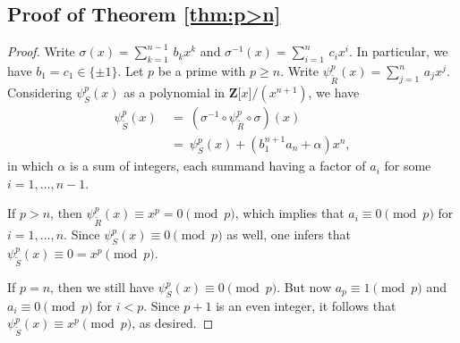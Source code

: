 \documentclass[reqno,11pt]{amsart}
\numberwithin{equation}{subsection}  %
\newcommand{\bZ}{\mathbf{Z}}
\begin{document}

\subsection{Proof of Theorem \ref{thm:p>n}}

\begin{proof}
Write $\sigma(x) = \sum_{k=1}^{n-1}\, b_k x^k$ and $\sigma^{-1}(x) = \sum_{i=1}^n\, c_i x^i$.  In particular, we have $b_1 = c_1 \in \lbrace \pm 1 \rbrace$.  Let $p$ be a prime with $p \geq n$.  Write $\psi^p_{\tilde{R}}(x) = \sum_{j=1}^n \, a_j x^j$.  Considering $\psi^p_S(x)$ as a polynomial in $\bZ \lbrack x \rbrack/(x^{n+1})$, we have
   \[
   \begin{split}
   \psi^p_{\tilde{S}}(x) 
   &~=~ (\sigma^{-1} \circ \psi^p_{\tilde{R}} \circ \sigma)(x) \\
   &~=~ \psi^p_S(x) + (b_1^{n+1} a_n + \alpha)x^n,
   \end{split}
   \]
in which $\alpha$ is a sum of integers, each summand having a factor of $a_i$ for some $i = 1, \ldots, n-1$.


If $p > n$, then $\psi^p_{\tilde{R}}(x) \equiv x^p = 0 \pmod{p}$, which implies that $a_i \equiv 0 \pmod{p}$ for $i = 1, \ldots, n$.  Since $\psi^p_S(x) \equiv 0 \pmod{p}$ as well, one infers that $\psi^p_{\tilde{S}}(x) \equiv 0 = x^p \pmod{p}$.


If $p = n$, then we still have $\psi^p_S(x) \equiv 0 \pmod{p}$.  But now $a_p \equiv 1 \pmod{p}$ and $a_i \equiv 0 \pmod{p}$ for $i < p$.  Since $p + 1$ is an even integer, it follows that $\psi^p_{\tilde{S}}(x) \equiv x^p \pmod{p}$, as desired.
\end{proof}


\end{document}
